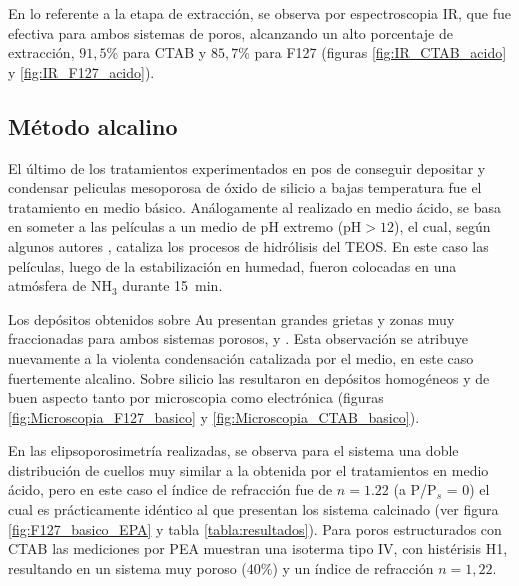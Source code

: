 		 En lo referente a la etapa de extracción, se observa por espectroscopia IR, que fue efectiva para ambos sistemas de poros, alcanzando un alto porcentaje de extracción, $91,5$\% para CTAB y $85,7$\% para F127 (figuras \ref{fig:IR_CTAB_acido} y \ref{fig:IR_F127_acido}).  	
				
	 \subsection{Método alcalino}

	 	 El último de los tratamientos experimentados en pos de conseguir depositar y condensar peliculas mesoporosa de óxido de silicio a bajas temperatura fue el tratamiento en medio básico. Análogamente al realizado en medio ácido, se basa en someter a las películas a un medio de pH extremo (pH$>12$), el cual, según algunos autores \cite{Soler-Illia2011,Huo1996,Ichinose2002,GonzalezSolveyra2017}, cataliza los procesos de hidrólisis del TEOS. En este caso las películas, luego de la estabilización en humedad, fueron colocadas en una atmósfera de NH$_3$ durante \SI{15}{\minute}. 

		 Los depósitos obtenidos sobre Au presentan grandes grietas y zonas muy fraccionadas para ambos sistemas porosos, \pdmF\space y \pdmC. Esta observación se atribuye nuevamente a la violenta condensación catalizada por el medio, en este caso fuertemente alcalino. Sobre silicio las \pdm\space resultaron en depósitos homogéneos y de buen aspecto tanto por microscopia como electrónica (figuras \ref{fig:Microscopia_F127_basico} y \ref{fig:Microscopia_CTAB_basico}).

		 En las elipsoporosimetría realizadas, se observa para el sistema \pdmF\space una doble distribución de cuellos muy similar a la obtenida por el tratamientos en medio ácido, pero en este caso el índice de refracción fue de $n=1.22$ (a P/P$_s$ = 0) el cual es prácticamente idéntico al que presentan los sistema calcinado (ver figura \ref{fig:F127_basico_EPA} y tabla \ref{tabla:resultados}). Para poros estructurados con CTAB las mediciones por PEA muestran una isoterma tipo IV, con histérisis H1, resultando en un sistema muy poroso ($40\%$) y un índice de refracción $n=1,22$.
	
